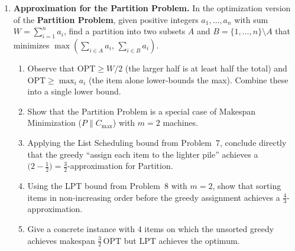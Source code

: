 \documentclass[9pt]{book}
\begin{document}
\begin{enumerate}[label=\arabic*.]
\begin{enumerate}[label=(\alph*)]
  \item Prove that the greedy achieves $\mathrm{ALG} \ge T/2$ whenever at least one item
        satisfies $a_i \le T$.
        (\textit{Hint:} Split into two cases: (i) the largest item $a_1 \ge T/2$---the first
        item added immediately gives $\mathrm{ALG} \ge T/2$; (ii) all items $< T/2$---suppose for
        contradiction that $\mathrm{ALG} < T/2$ and show that no item was ever skipped, so the
        greedy sum equals the sum of all items, which is at most $T$, giving $\mathrm{ALG}=\mathrm{OPT}$.)
  \item Conclude this is a 2-approximation: $\mathrm{ALG} \ge \mathrm{OPT}/2$.
        (\textit{Note:} $\mathrm{OPT} \le T$ always, so $T/2 \ge \mathrm{OPT}/2$.)
  \item Give an example showing the ratio can be close to 2.
  \item Explain why the exact problem is NP-hard yet the greedy gives a clean
        polynomial-time 2-approximation.  What structural property does the greedy exploit?
\end{enumerate}

\bigskip

\item \textbf{Approximation for the Partition Problem.}
In the optimization version of the \textbf{Partition Problem}, given positive integers
$a_1,\ldots,a_n$ with sum $W = \sum_{i=1}^n a_i$, find a partition into two subsets
$A$ and $B = \{1,\ldots,n\}\setminus A$ that minimizes $\max\!\left(\sum_{i\in A} a_i,\,\sum_{i\in B} a_i\right)$.
\begin{enumerate}[label=(\alph*)]
  \item Observe that $\mathrm{OPT} \ge W/2$ (the larger half is at least half the total)
        and $\mathrm{OPT} \ge \max_i a_i$ (the item alone lower-bounds the max).
        Combine these into a single lower bound.
  \item Show that the Partition Problem is a special case of Makespan Minimization
        ($P\|C_{\max}$) with $m=2$ machines.
  \item Applying the List Scheduling bound from Problem~7, conclude directly that the
        greedy ``assign each item to the lighter pile'' achieves a
        $\bigl(2-\tfrac{1}{2}\bigr) = \tfrac{3}{2}$-approximation for Partition.
  \item Using the LPT bound from Problem~8 with $m=2$, show that sorting items in
        non-increasing order before the greedy assignment achieves a
        $\tfrac{4}{3}$-approximation.
  \item Give a concrete instance with 4 items on which the unsorted greedy achieves
        makespan $\tfrac{3}{2}\,\mathrm{OPT}$ but LPT achieves the optimum.
\end{enumerate}


\end{enumerate}
\end{document}
